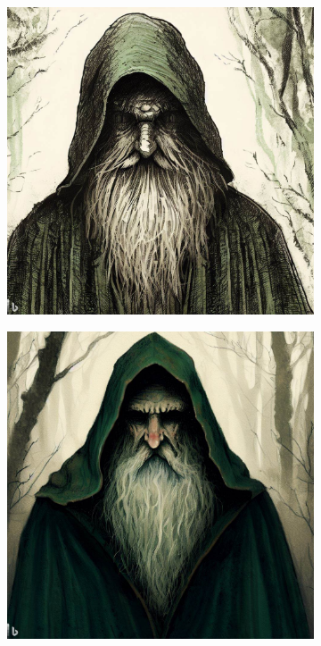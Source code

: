 \documentclass[11pt, twoside]{article}
\begin{document}
\begin{figure}[H]
\begin{subfigure}{0.3\textwidth}
    \includegraphics[width=0.99\linewidth]{gmann2.jpeg}
  \end{subfigure}%
  \begin{subfigure}{0.3\textwidth}
    \centering
    \includegraphics[width=0.99\linewidth]{gmann3.jpeg}
  \end{subfigure}
\end{figure}
\end{document}

